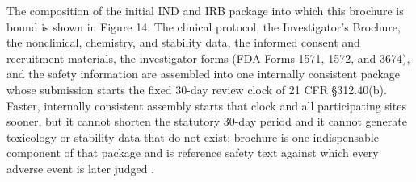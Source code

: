 The composition of the initial IND and IRB package into which this brochure is
bound is shown in Figure 14. The clinical protocol, the Investigator's Brochure,
the nonclinical, chemistry, and stability data, the informed consent and
recruitment materials, the investigator forms (FDA Forms 1571, 1572, and 3674),
and the safety information are assembled into one internally consistent package
whose submission starts the fixed 30-day review clock of 21 CFR \S 312.40(b).
Faster, internally consistent assembly starts that clock and all participating
sites sooner, but it cannot shorten the statutory 30-day period and it cannot
generate toxicology or stability data that do not exist; brochure is one
indispensable component of that package and is reference safety text against
which every adverse event is later judged \cite{phase1guidance,paisitedocpk}.

\clearpage


